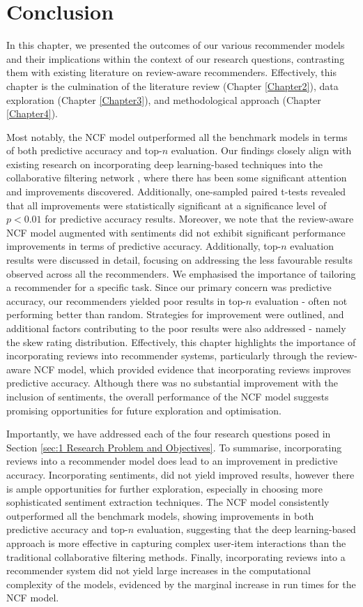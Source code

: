 \section{Conclusion}
\label{sec:5 Conclusion for Results}

In this chapter, we presented the outcomes of our various recommender models and their implications within the context of our research questions, contrasting them with existing literature on review-aware recommenders. Effectively, this chapter is the culmination of the literature review (Chapter \ref{Chapter2}), data exploration (Chapter \ref{Chapter3}), and methodological approach (Chapter \ref{Chapter4}).

Most notably, the NCF model outperformed all the benchmark models in terms of both predictive accuracy and top-$n$ evaluation. Our findings closely align with existing research on incorporating deep learning-based techniques into the collaborative filtering network \cite{he2017neural}, where there has been some significant attention and improvements discovered. Additionally, one-sampled paired t-tests revealed that all improvements were statistically significant at a significance level of $p < 0.01$ for predictive accuracy results. Moreover, we note that the review-aware NCF model augmented with sentiments did not exhibit significant performance improvements in terms of predictive accuracy. Additionally, top-$n$ evaluation results were discussed in detail, focusing on addressing the less favourable results observed across all the recommenders. We emphasised the importance of tailoring a recommender for a specific task. Since our primary concern was predictive accuracy, our recommenders yielded  poor results in top-$n$ evaluation - often not performing better than random. Strategies for improvement were outlined, and additional factors contributing to the poor results were also addressed - namely the skew rating distribution. Effectively, this chapter highlights the importance of incorporating reviews into recommender systems, particularly through the review-aware NCF model, which provided evidence that incorporating reviews improves predictive accuracy. Although there was no substantial improvement with the inclusion of sentiments, the overall performance of the NCF model suggests promising opportunities for future exploration and optimisation. 

Importantly, we have addressed each of the four research questions posed in Section \ref{sec:1 Research Problem and Objectives}. To summarise, incorporating reviews into a recommender model does lead to an improvement in predictive accuracy. Incorporating sentiments, did not yield improved results, however there is ample opportunities for further exploration, especially in choosing more sophisticated sentiment extraction techniques. The NCF model consistently outperformed all the benchmark models, showing improvements in both predictive accuracy and top-$n$ evaluation, suggesting that the deep learning-based approach is more effective in capturing complex user-item interactions than the traditional collaborative filtering methods. Finally, incorporating reviews into a recommender system did not yield large increases in the computational complexity of the models, evidenced by the marginal increase in run times for the NCF model. 
